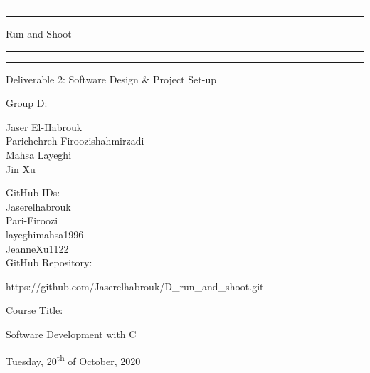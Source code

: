 \documentclass[a4paper, 11pt, oneside]{article}
\begin{document}
 
\begin{titlepage} 
\centering
\vspace*{\baselineskip}
\rule{\textwidth}{1.6pt}\vspace*{-\baselineskip}\vspace*{2pt} 
\rule{\textwidth}{0.4pt} 
\vspace{0.75\baselineskip} 

{\LARGE Run and Shoot}

\vspace{0.75\baselineskip} 
\rule{\textwidth}{0.4pt}\vspace*{-\baselineskip}\vspace{3.2pt}
\rule{\textwidth}{1.6pt}
\vspace{2\baselineskip}

	{\Large Deliverable 2: Software Design \& Project Set-up} %
	
	\vspace*{3\baselineskip} %
	
	
	Group D:
	
	\vspace{2.0\baselineskip} %
	
	{ Jaser El-Habrouk\\
	  Parichehreh Firoozishahmirzadi\\
	  Mahsa Layeghi\\
	  Jin Xu\\
	}
	
	\vspace{3\baselineskip} 
	
	GitHub IDs:\\
	\vspace{0.5\baselineskip} %
	Jaserelhabrouk\\
	Pari-Firoozi\\
	layeghimahsa1996\\
	JeanneXu1122\\
	\vspace{2.0\baselineskip} %
	GitHub Repository:
	\vspace{0.5\baselineskip} %
	
	{https://github.com/Jaserelhabrouk/D\_run\_and\_shoot.git}
	
	\vspace{3\baselineskip} %
	
	Course Title:
	\vspace{0.5\baselineskip} %
	
	{\Large Software Development with C} 
	
	\vfill %
	
	
	\vspace{0.3\baselineskip} %
	
	Tuesday, 20\textsuperscript{th} of October, 2020 %
\end{titlepage}
\end{document}
